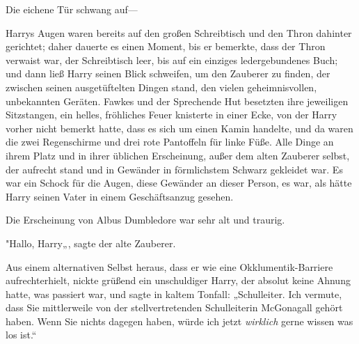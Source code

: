 Die eichene Tür schwang auf—

Harrys Augen waren bereits auf den großen Schreibtisch und den Thron dahinter gerichtet; daher dauerte es einen Moment, bis er bemerkte, dass der Thron verwaist war, der Schreibtisch leer, bis auf ein einziges ledergebundenes Buch; und dann ließ Harry seinen Blick schweifen, um den Zauberer zu finden, der zwischen seinen ausgetüftelten Dingen stand, den vielen geheimnisvollen, unbekannten Geräten. Fawkes und der Sprechende Hut besetzten ihre jeweiligen Sitzstangen, ein helles, fröhliches Feuer knisterte in einer Ecke, von der Harry vorher nicht bemerkt hatte, dass es sich um einen Kamin handelte, und da waren die zwei Regenschirme und drei rote Pantoffeln für linke Füße. Alle Dinge an ihrem Platz und in ihrer üblichen Erscheinung, außer dem alten Zauberer selbst, der aufrecht stand und in Gewänder in förmlichstem Schwarz gekleidet war. Es war ein Schock für die Augen, diese Gewänder an dieser Person, es war, als hätte Harry seinen Vater in einem Geschäftsanzug gesehen.

Die Erscheinung von Albus Dumbledore war sehr alt und traurig.

"Hallo, Harry„, sagte der alte Zauberer.

Aus einem alternativen Selbst heraus, dass er wie eine Okklumentik-Barriere aufrechterhielt, nickte grüßend ein unschuldiger Harry, der absolut keine Ahnung hatte, was passiert war, und sagte in kaltem Tonfall: „Schulleiter. Ich vermute, dass Sie mittlerweile von der stellvertretenden Schulleiterin McGonagall gehört haben. Wenn Sie nichts dagegen haben, würde ich jetzt \emph{wirklich} gerne wissen was los ist.“

